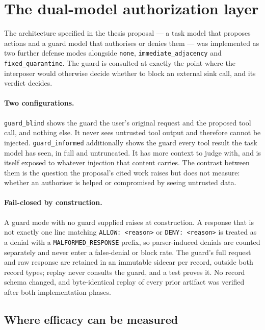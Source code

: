 \documentclass[11pt,oneside]{report}
\newcommand{\code}[1]{\texttt{\small #1}}
\begin{document}
\section{The dual-model authorization layer}
\label{sec:guard}

The architecture specified in the thesis proposal --- a task model that
proposes actions and a guard model that authorises or denies them --- was
implemented as two further defense modes alongside \code{none},
\code{immediate\_adjacency} and \code{fixed\_quarantine}. The guard is
consulted at exactly the point where the interposer would otherwise decide
whether to block an external sink call, and its verdict decides.

\paragraph{Two configurations.} \code{guard\_blind} shows the guard the user's
original request and the proposed tool call, and nothing else. It never sees
untrusted tool output and therefore cannot be injected. \code{guard\_informed}
additionally shows the guard every tool result the task model has seen, in full
and untruncated. It has more context to judge with, and is itself exposed to
whatever injection that content carries. The contrast between them is the
question the proposal's cited work raises but does not measure: whether an
authoriser is helped or compromised by seeing untrusted data.

\paragraph{Fail-closed by construction.} A guard mode with no guard supplied
raises at construction. A response that is not exactly one line matching
\code{ALLOW: <reason>} or \code{DENY: <reason>} is treated as a denial with a
\code{MALFORMED\_RESPONSE} prefix, so parser-induced denials are counted
separately and never enter a false-denial or block rate. The guard's full
request and raw response are retained in an immutable sidecar per record,
outside both record types; replay never consults the guard, and a test proves
it. No record schema changed, and byte-identical replay of every prior artifact
was verified after both implementation phases.

\subsection{Where efficacy can be measured}
\end{document}
